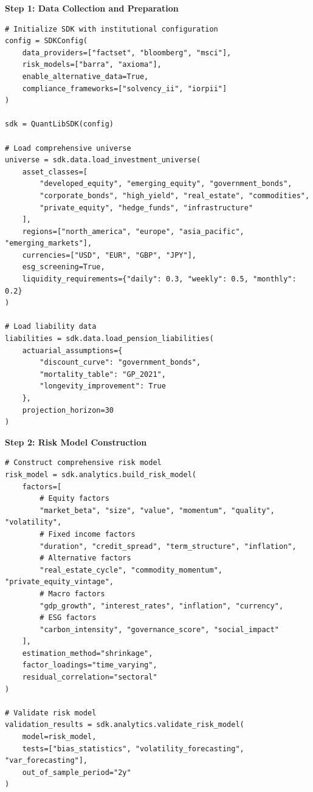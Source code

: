 \documentclass[12pt,a4paper]{article}
\theoremstyle{definition}
\theoremstyle{remark}
\begin{document}
\textbf{Step 1: Data Collection and Preparation}
\begin{lstlisting}[caption=Pension Fund Data Setup]
# Initialize SDK with institutional configuration
config = SDKConfig(
    data_providers=["factset", "bloomberg", "msci"],
    risk_models=["barra", "axioma"],
    enable_alternative_data=True,
    compliance_frameworks=["solvency_ii", "iorpii"]
)

sdk = QuantLibSDK(config)

# Load comprehensive universe
universe = sdk.data.load_investment_universe(
    asset_classes=[
        "developed_equity", "emerging_equity", "government_bonds",
        "corporate_bonds", "high_yield", "real_estate", "commodities",
        "private_equity", "hedge_funds", "infrastructure"
    ],
    regions=["north_america", "europe", "asia_pacific", "emerging_markets"],
    currencies=["USD", "EUR", "GBP", "JPY"],
    esg_screening=True,
    liquidity_requirements={"daily": 0.3, "weekly": 0.5, "monthly": 0.2}
)

# Load liability data
liabilities = sdk.data.load_pension_liabilities(
    actuarial_assumptions={
        "discount_curve": "government_bonds",
        "mortality_table": "GP_2021",
        "longevity_improvement": True
    },
    projection_horizon=30
)
\end{lstlisting}

\textbf{Step 2: Risk Model Construction}
\begin{lstlisting}[caption=Multi-Factor Risk Model]
# Construct comprehensive risk model
risk_model = sdk.analytics.build_risk_model(
    factors=[
        # Equity factors
        "market_beta", "size", "value", "momentum", "quality", "volatility",
        # Fixed income factors
        "duration", "credit_spread", "term_structure", "inflation",
        # Alternative factors
        "real_estate_cycle", "commodity_momentum", "private_equity_vintage",
        # Macro factors
        "gdp_growth", "interest_rates", "inflation", "currency",
        # ESG factors
        "carbon_intensity", "governance_score", "social_impact"
    ],
    estimation_method="shrinkage",
    factor_loadings="time_varying",
    residual_correlation="sectoral"
)

# Validate risk model
validation_results = sdk.analytics.validate_risk_model(
    model=risk_model,
    tests=["bias_statistics", "volatility_forecasting", "var_forecasting"],
    out_of_sample_period="2y"
)
\end{lstlisting}
\end{document}
